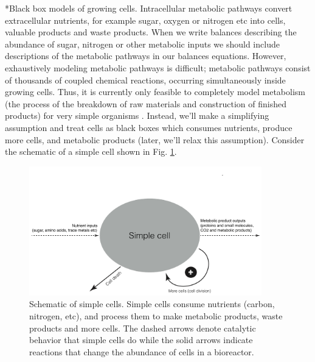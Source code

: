 \documentclass[11pt]{article}
\makeatletter
\theoremstyle{definition}
\renewcommand\subsection{\@startsection
	{subsection}{2}{0mm}
	{-0.05in}
	{-0.5\baselineskip}
	{\normalfont\normalsize\bfseries}}
\makeatother
\begin{document}
\subsection*{Black box models of growing cells.}
Intracellular metabolic pathways convert extracellular nutrients, for example sugar, oxygen or nitrogen etc into cells, valuable products and waste products.
When we write balances describing the abundance of sugar, nitrogen or other metabolic inputs we should include descriptions of the metabolic pathways in our balances equations.
However, exhaustively modeling metabolic pathways is difficult; metabolic pathways consist of thousands of coupled chemical reactions, occurring simultaneously inside growing cells.
Thus, it is currently only feasible to completely model metabolism (the process of the breakdown of raw materials and construction of finished products)
for very simple organisms \citep{Karr:2012ve}. Instead, we'll make a simplifying assumption and treat cells as black boxes which consumes nutrients, produce more cells, and metabolic products (later, we'll relax this assumption). Consider the schematic of a simple cell shown in Fig. \ref{fig-simple-cells}.

\begin{figure}[!ht]\centering
\includegraphics[width=0.9\textwidth]{./figs/SchematicSimpleCells-1-6-15.pdf}
\caption{Schematic of simple cells. Simple cells consume nutrients (carbon, nitrogen, etc), and process them to make metabolic products, waste products and more cells.
The dashed arrows denote catalytic behavior that simple cells do while the solid arrows indicate reactions that change the abundance of cells in a bioreactor. }\label{fig-simple-cells}
\end{figure}
\end{document}
